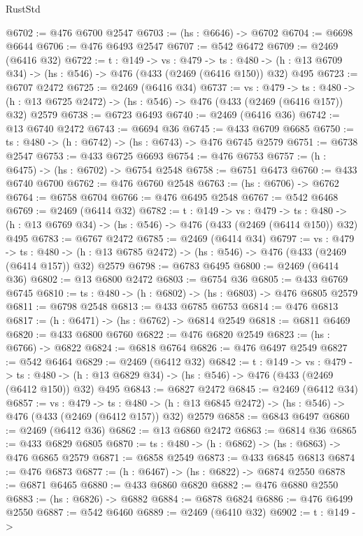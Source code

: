 \begin{lexlean}{RustStd}
\begin{coremodule}
@6702 := @476 @6700 @2547
@6703 := (hs : @6646) -> @6702
@6704 := @6698 @6644
@6706 := @476 @6493 @2547
@6707 := @542 @6472
@6709 := @2469 (@6416 @32)
@6722 := {t : @149} ->
  {vs : @479} ->
  {ts : @480} -> (h : @13 @6709 @34) -> (hs : @546) -> @476 (@433 (@2469 (@6416 @150)) @32) @495
@6723 := @6707 @2472
@6725 := @2469 (@6416 @34)
@6737 := {vs : @479} ->
  {ts : @480} -> (h : @13 @6725 @2472) -> (hs : @546) -> @476 (@433 (@2469 (@6416 @157)) @32) @2579
@6738 := @6723 @6493
@6740 := @2469 (@6416 @36)
@6742 := @13 @6740 @2472
@6743 := @6694 @36
@6745 := @433 @6709 @6685
@6750 := {ts : @480} -> (h : @6742) -> (hs : @6743) -> @476 @6745 @2579
@6751 := @6738 @2547
@6753 := @433 @6725 @6693
@6754 := @476 @6753
@6757 := (h : @6475) -> (hs : @6702) -> @6754 @2548
@6758 := @6751 @6473
@6760 := @433 @6740 @6700
@6762 := @476 @6760 @2548
@6763 := (hs : @6706) -> @6762
@6764 := @6758 @6704
@6766 := @476 @6495 @2548
@6767 := @542 @6468
@6769 := @2469 (@6414 @32)
@6782 := {t : @149} ->
  {vs : @479} ->
  {ts : @480} -> (h : @13 @6769 @34) -> (hs : @546) -> @476 (@433 (@2469 (@6414 @150)) @32) @495
@6783 := @6767 @2472
@6785 := @2469 (@6414 @34)
@6797 := {vs : @479} ->
  {ts : @480} -> (h : @13 @6785 @2472) -> (hs : @546) -> @476 (@433 (@2469 (@6414 @157)) @32) @2579
@6798 := @6783 @6495
@6800 := @2469 (@6414 @36)
@6802 := @13 @6800 @2472
@6803 := @6754 @36
@6805 := @433 @6769 @6745
@6810 := {ts : @480} -> (h : @6802) -> (hs : @6803) -> @476 @6805 @2579
@6811 := @6798 @2548
@6813 := @433 @6785 @6753
@6814 := @476 @6813
@6817 := (h : @6471) -> (hs : @6762) -> @6814 @2549
@6818 := @6811 @6469
@6820 := @433 @6800 @6760
@6822 := @476 @6820 @2549
@6823 := (hs : @6766) -> @6822
@6824 := @6818 @6764
@6826 := @476 @6497 @2549
@6827 := @542 @6464
@6829 := @2469 (@6412 @32)
@6842 := {t : @149} ->
  {vs : @479} ->
  {ts : @480} -> (h : @13 @6829 @34) -> (hs : @546) -> @476 (@433 (@2469 (@6412 @150)) @32) @495
@6843 := @6827 @2472
@6845 := @2469 (@6412 @34)
@6857 := {vs : @479} ->
  {ts : @480} -> (h : @13 @6845 @2472) -> (hs : @546) -> @476 (@433 (@2469 (@6412 @157)) @32) @2579
@6858 := @6843 @6497
@6860 := @2469 (@6412 @36)
@6862 := @13 @6860 @2472
@6863 := @6814 @36
@6865 := @433 @6829 @6805
@6870 := {ts : @480} -> (h : @6862) -> (hs : @6863) -> @476 @6865 @2579
@6871 := @6858 @2549
@6873 := @433 @6845 @6813
@6874 := @476 @6873
@6877 := (h : @6467) -> (hs : @6822) -> @6874 @2550
@6878 := @6871 @6465
@6880 := @433 @6860 @6820
@6882 := @476 @6880 @2550
@6883 := (hs : @6826) -> @6882
@6884 := @6878 @6824
@6886 := @476 @6499 @2550
@6887 := @542 @6460
@6889 := @2469 (@6410 @32)
@6902 := {t : @149} ->

\end{coremodule}
\end{lexlean}
